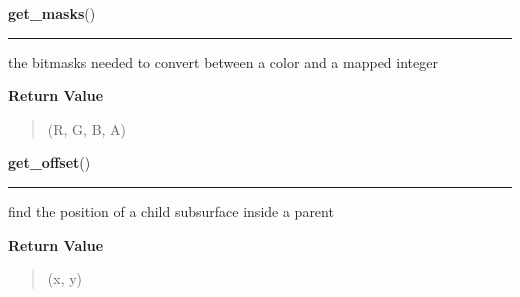 \hspace{.8\funcindent}\begin{boxedminipage}{\funcwidth}

    \raggedright \textbf{get\_masks}()

    \vspace{-1.5ex}

    \rule{\textwidth}{0.5\fboxrule}
\setlength{\parskip}{2ex}
    the bitmasks needed to convert between a color and a mapped integer

\setlength{\parskip}{1ex}
      \textbf{Return Value}
    \vspace{-1ex}

      \begin{quote}
      (R, G, B, A)

      \end{quote}

    \end{boxedminipage}

    \label{pygame:Surface:get_offset}

    \vspace{0.5ex}

\hspace{.8\funcindent}\begin{boxedminipage}{\funcwidth}

    \raggedright \textbf{get\_offset}()

    \vspace{-1.5ex}

    \rule{\textwidth}{0.5\fboxrule}
\setlength{\parskip}{2ex}
    find the position of a child subsurface inside a parent

\setlength{\parskip}{1ex}
      \textbf{Return Value}
    \vspace{-1ex}

      \begin{quote}
      (x, y)

      \end{quote}

    \end{boxedminipage}

    \label{pygame:Surface:get_palette}

    \vspace{0.5ex}

